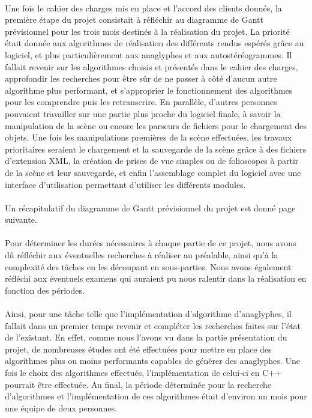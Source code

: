 \paragraph{}
Une fois le cahier des charges mis en place et l'accord des clients donnés, la première étape du projet consistait à réfléchir au diagramme de Gantt prévisionnel pour les trois mois destinés à la réalisation du projet.
La priorité était donnée aux algorithmes de réalisation des différents rendus espérés grâce au logiciel, et plus particulièrement aux anaglyphes et aux autostéréogrammes. Il fallait revenir sur les algorithmes choisis et présentés dans le cahier des charges, approfondir les recherches pour être sûr de ne passer à côté d'aucun autre algorithme plus performant, et s'approprier le fonctionnement des algorithmes pour les comprendre puis les retranscrire.
En parallèle, d'autres personnes pouvaient travailler sur une partie plus proche du logiciel finale, à savoir la manipulation de la scène ou encore les parseurs de fichiers pour le chargement des objets.
Une fois les manipulations premières de la scène effectuées, les travaux prioritaires seraient le chargement et la sauvegarde de la scène grâce à des fichiers d'extension XML, la création de prises de vue simples ou de folioscopes à partir de la scène et leur sauvegarde, et enfin l'assemblage complet du logiciel avec une interface d'utilisation permettant d'utiliser les différents modules.

\paragraph{}
Un récapitulatif du diagramme de Gantt prévisionnel du projet est donné page suivante.

\newpage

\newpage

\paragraph{}
Pour déterminer les durées nécessaires à chaque partie de ce projet, nous avons dû réfléchir aux éventuelles recherches à réaliser au préalable, ainsi qu'à la complexité des tâches en les découpant en sous-parties. Nous avons également réfléchi aux éventuels examens qui auraient pu nous ralentir dans la réalisation en fonction des périodes.

\paragraph{}
Ainsi, pour une tâche telle que l'implémentation d'algorithme d'anaglyphes, il fallait dans un premier temps revenir et compléter les recherches faites sur l'état de l'existant. En effet, comme nous l'avons vu dans la partie présentation du projet, de nombreuses études ont été effectuées pour mettre en place des algorithmes plus ou moins performants capables de générer des anaglyphes. Une fois le choix des algorithmes effectués, l'implémentation de celui-ci en C++ pourrait être effectuée.
Au final, la période déterminée pour la recherche d'algorithmes et l'implémentation de ces algorithmes était d'environ un mois pour une équipe de deux personnes.

